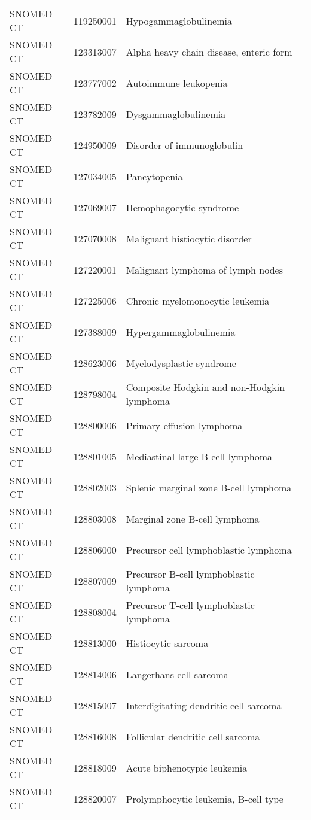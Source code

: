 \begin{table}[ht]
\begin{tabular}{lll}
  SNOMED CT & 119250001 & Hypogammaglobulinemia \\ 
  SNOMED CT & 123313007 & Alpha heavy chain disease, enteric form \\ 
  SNOMED CT & 123777002 & Autoimmune leukopenia \\ 
  SNOMED CT & 123782009 & Dysgammaglobulinemia \\ 
  SNOMED CT & 124950009 & Disorder of immunoglobulin \\ 
  SNOMED CT & 127034005 & Pancytopenia \\ 
  SNOMED CT & 127069007 & Hemophagocytic syndrome \\ 
  SNOMED CT & 127070008 & Malignant histiocytic disorder \\ 
  SNOMED CT & 127220001 & Malignant lymphoma of lymph nodes \\ 
  SNOMED CT & 127225006 & Chronic myelomonocytic leukemia \\ 
  SNOMED CT & 127388009 & Hypergammaglobulinemia \\ 
  SNOMED CT & 128623006 & Myelodysplastic syndrome \\ 
  SNOMED CT & 128798004 & Composite Hodgkin and non-Hodgkin lymphoma \\ 
  SNOMED CT & 128800006 & Primary effusion lymphoma \\ 
  SNOMED CT & 128801005 & Mediastinal large B-cell lymphoma \\ 
  SNOMED CT & 128802003 & Splenic marginal zone B-cell lymphoma \\ 
  SNOMED CT & 128803008 & Marginal zone B-cell lymphoma \\ 
  SNOMED CT & 128806000 & Precursor cell lymphoblastic lymphoma \\ 
  SNOMED CT & 128807009 & Precursor B-cell lymphoblastic lymphoma \\ 
  SNOMED CT & 128808004 & Precursor T-cell lymphoblastic lymphoma \\ 
  SNOMED CT & 128813000 & Histiocytic sarcoma \\ 
  SNOMED CT & 128814006 & Langerhans cell sarcoma \\ 
  SNOMED CT & 128815007 & Interdigitating dendritic cell sarcoma \\ 
  SNOMED CT & 128816008 & Follicular dendritic cell sarcoma \\ 
  SNOMED CT & 128818009 & Acute biphenotypic leukemia \\ 
  SNOMED CT & 128820007 & Prolymphocytic leukemia, B-cell type \\ 

\end{tabular}
\end{table}
